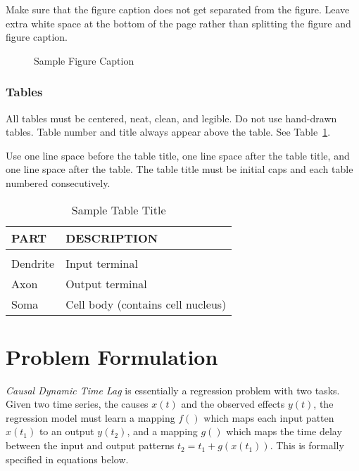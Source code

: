 \documentclass[twoside]{article}
\begin{document}
Make sure that the figure caption does not get separated from the
figure. Leave extra white space at the bottom of the page rather than
splitting the figure and figure caption.
\begin{figure}[h]
\vspace{.3in}
\centerline{}
\vspace{.3in}
\caption{Sample Figure Caption}
\end{figure}

\subsubsection{Tables}

All tables must be centered, neat, clean, and legible. Do not use hand-drawn tables.
Table number and title always appear above the table.
See Table~\ref{sample-table}.

Use one line space before the table title, one line space after the table title,
and one line space after the table. The table title must be
initial caps and each table numbered consecutively.

\begin{table}[h]
\caption{Sample Table Title} \label{sample-table}
\begin{center}
\begin{tabular}{ll}
\textbf{PART}  &\textbf{DESCRIPTION} \\
\hline \\
Dendrite         &Input terminal \\
Axon             &Output terminal \\
Soma             &Cell body (contains cell nucleus) \\
\end{tabular}
\end{center}
\end{table}

\section{Problem Formulation}

\emph{Causal Dynamic Time Lag} is essentially a regression problem with two tasks. Given two time series, 
the causes $x(t)$ and the observed effects $y(t)$, the regression model must learn a mapping $f()$ which
maps each input patten $x(t_1)$ to an output $y(t_2)$, and a mapping $g()$ which maps the time delay between
the input and output patterns $t_2 = t_1 + g(x(t_1))$. This is formally specified in equations below.
\end{document}
